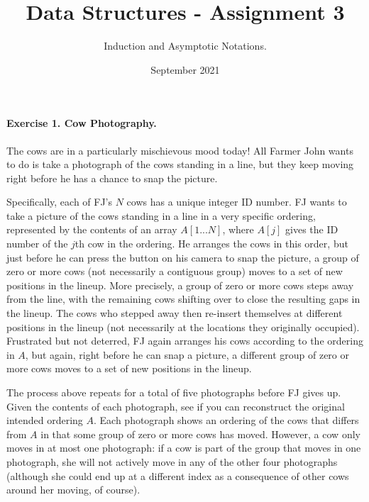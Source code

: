 \title{Data Structures - Assignment 3} 
\author{Induction and Asymptotic Notations.}
\date{September 2021}



\paragraph{Exercise 1. Cow Photography.}
The cows are in a particularly mischievous mood today!  All Farmer John
wants to do is take a photograph of the cows standing in a line, but they
keep moving right before he has a chance to snap the picture.

Specifically, each of FJ's \(N\)  cows has a unique
integer ID number.  FJ wants to take a picture of the cows standing in
a line in a very specific ordering, represented by the contents of an
array \( A[1...N]\), where \( A[j]\) gives the ID number of the \(j\)th cow in the
ordering.  He arranges the cows in this order, but just before he can
press the button on his camera to snap the picture, a group of zero or
more cows (not necessarily a contiguous group) moves to a set of new
positions in the lineup.  More precisely, a group of zero or more cows
steps away from the line, with the remaining cows shifting over to
close the resulting gaps in the lineup.  The cows who stepped away
then re-insert themselves at different positions in the lineup (not
necessarily at the locations they originally occupied).  Frustrated
but not deterred, FJ again arranges his cows according to the ordering
in \(A\), but again, right before he can snap a picture, a different group
of zero or more cows moves to a set of new positions in the lineup.

The process above repeats for a total of five photographs before FJ gives
up.  Given the contents of each photograph, see if you can reconstruct the
original intended ordering \(A\).  Each photograph shows an ordering of the
cows that differs from \(A\) in that some group of zero or more cows has moved.
However, a cow only moves in at most one photograph: if a cow is part of
the group that moves in one photograph, she will not actively move in any
of the other four photographs (although she could end up at a different
index as a consequence of other cows around her moving, of course).


